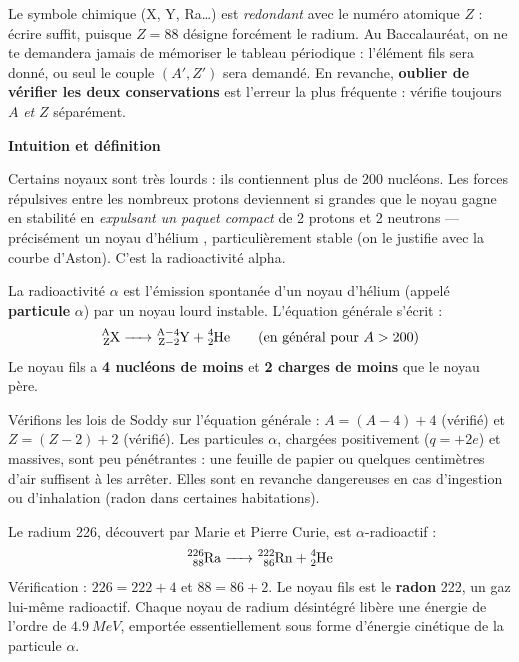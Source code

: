 \documentclass[11pt]{article}
\newcommand{\cle}[1]{{\popxbold\color{popdark}#1}}
\newcounter{popsec}
\newcounter{popsub}
\newcommand{\courssub}[1]{%
  \stepcounter{popsub}%
  \par\vspace{9pt}\noindent{\popxbold\fontsize{11.5}{13}\selectfont\color{popink}{\color{poporange}\thepopsec.\thepopsub}\hspace{6pt}#1}\par\nopagebreak\vspace{4pt}
}
\begin{document}
\begin{attention}
Le symbole chimique (X, Y, Ra\ldots) est \emph{redondant} avec le numéro atomique $Z$ : écrire  suffit, puisque $Z = 88$ désigne forcément le radium. Au Baccalauréat, on ne te demandera jamais de mémoriser le tableau périodique : l'élément fils sera donné, ou seul le couple $(A', Z')$ sera demandé. En revanche, \textbf{oublier de vérifier les deux conservations} est l'erreur la plus fréquente : vérifie toujours $A$ \emph{et} $Z$ séparément.
\end{attention}

\courssub{La radioactivité $\alpha$}

\textbf{Intuition et définition}\par

Certains noyaux sont très lourds : ils contiennent plus de 200 nucléons. Les forces répulsives entre les nombreux protons deviennent si grandes que le noyau gagne en stabilité en \emph{expulsant un paquet compact} de 2 protons et 2 neutrons — précisément un noyau d'hélium , particulièrement stable (on le justifie avec la courbe d'Aston). C'est la \cle{radioactivité alpha}.

\begin{definition}
La radioactivité $\alpha$ est l'émission spontanée d'un noyau d'hélium  (appelé \textbf{particule} $\alpha$) par un noyau lourd instable. L'équation générale s'écrit :
\[ \ce{^{A}_{Z}X -> ^{A-4}_{Z-2}Y + ^{4}_{2}He} \qquad (\text{en général pour } A > 200) \]
Le noyau fils a \textbf{4 nucléons de moins} et \textbf{2 charges de moins} que le noyau père.
\end{definition}

Vérifions les lois de Soddy sur l'équation générale : $A = (A-4) + 4$ (vérifié) et $Z = (Z-2) + 2$ (vérifié). Les particules $\alpha$, chargées positivement ($q = +2e$) et massives, sont peu pénétrantes : une feuille de papier ou quelques centimètres d'air suffisent à les arrêter. Elles sont en revanche dangereuses en cas d'ingestion ou d'inhalation (radon dans certaines habitations).

\begin{exemplebox}
Le radium 226, découvert par Marie et Pierre Curie, est $\alpha$-radioactif :
\[ \ce{^{226}_{88}Ra -> ^{222}_{86}Rn + ^{4}_{2}He} \]
Vérification : $226 = 222 + 4$ et $88 = 86 + 2$. Le noyau fils est le \textbf{radon} 222, un gaz lui-même radioactif. Chaque noyau de radium désintégré libère une énergie de l'ordre de $\SI{4,9}{MeV}$, emportée essentiellement sous forme d'énergie cinétique de la particule $\alpha$.
\end{exemplebox}
\end{document}
